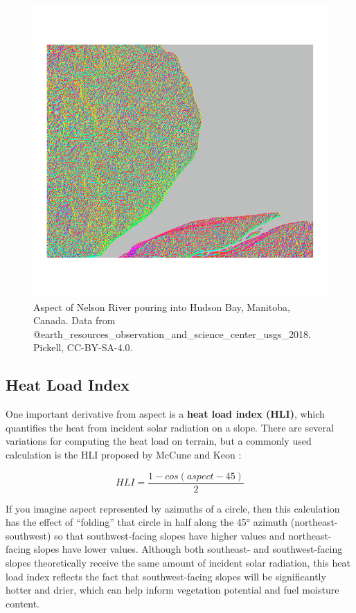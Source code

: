 \documentclass[
]{book}
\begin{document}
\begin{figure}
\includegraphics[width=0.75\linewidth]{images/09-nelson-river-aspect} \caption{Aspect of Nelson River pouring into Hudson Bay, Manitoba, Canada. Data from @earth_resources_observation_and_science_center_usgs_2018. Pickell, CC-BY-SA-4.0.}\label{fig:9-nelson-river-aspect}
\end{figure}

\hypertarget{heat-load-index}{%
\subsection{Heat Load Index}\label{heat-load-index}}

One important derivative from aspect is a \textbf{heat load index (HLI)}, which quantifies the heat from incident solar radiation on a slope. There are several variations for computing the heat load on terrain, but a commonly used calculation is the HLI proposed by McCune and Keon \citep{mccune_equations_2002}:

\[
HLI=\frac{1-cos(aspect-45)}{2}
\]

If you imagine aspect represented by azimuths of a circle, then this calculation has the effect of ``folding'' that circle in half along the 45° azimuth (northeast-southwest) so that southwest-facing slopes have higher values and northeast-facing slopes have lower values. Although both southeast- and southwest-facing slopes theoretically receive the same amount of incident solar radiation, this heat load index reflects the fact that southwest-facing slopes will be significantly hotter and drier, which can help inform vegetation potential and fuel moisture content.
\end{document}
